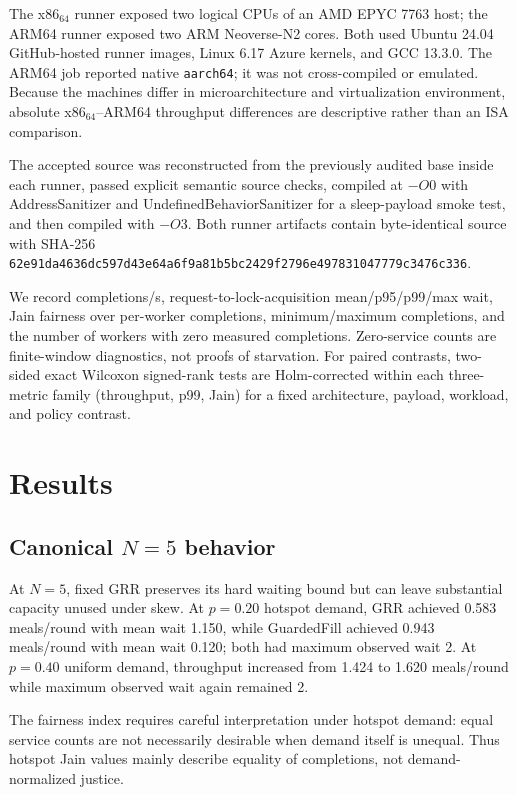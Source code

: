 \documentclass[10pt,journal]{IEEEtran}
\begin{document}
The x86$_{64}$ runner exposed two logical CPUs of an AMD EPYC 7763 host; the ARM64 runner exposed two ARM Neoverse-N2 cores. Both used Ubuntu 24.04 GitHub-hosted runner images, Linux 6.17 Azure kernels, and GCC 13.3.0. The ARM64 job reported native \texttt{aarch64}; it was not cross-compiled or emulated. Because the machines differ in microarchitecture and virtualization environment, absolute x86$_{64}$--ARM64 throughput differences are descriptive rather than an ISA comparison.

The accepted source was reconstructed from the previously audited base inside each runner, passed explicit semantic source checks, compiled at $-O0$ with AddressSanitizer and UndefinedBehaviorSanitizer for a sleep-payload smoke test, and then compiled with $-O3$. Both runner artifacts contain byte-identical source with SHA-256 \texttt{62e91da4\allowbreak{}636dc597\allowbreak{}d43e64a6\allowbreak{}f9a81b5b\allowbreak{}c2429f27\allowbreak{}96e49783\allowbreak{}1047779c\allowbreak{}3476c336}.

We record completions/s, request-to-lock-acquisition mean/p95/p99/max wait, Jain fairness over per-worker completions, minimum/maximum completions, and the number of workers with zero measured completions. Zero-service counts are finite-window diagnostics, not proofs of starvation. For paired contrasts, two-sided exact Wilcoxon signed-rank tests are Holm-corrected within each three-metric family (throughput, p99, Jain) for a fixed architecture, payload, workload, and policy contrast.

\section{Results}
\subsection{Canonical $N=5$ behavior}
At $N=5$, fixed GRR preserves its hard waiting bound but can leave substantial capacity unused under skew. At $p=0.20$ hotspot demand, GRR achieved 0.583 meals/round with mean wait 1.150, while GuardedFill achieved 0.943 meals/round with mean wait 0.120; both had maximum observed wait 2. At $p=0.40$ uniform demand, throughput increased from 1.424 to 1.620 meals/round while maximum observed wait again remained 2.

The fairness index requires careful interpretation under hotspot demand: equal service counts are not necessarily desirable when demand itself is unequal. Thus hotspot Jain values mainly describe equality of completions, not demand-normalized justice.
\end{document}
